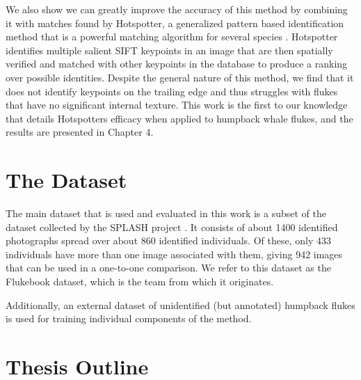 
We also show we can greatly improve the accuracy of this method by combining it with matches found by Hotspotter, a generalized pattern based identification method that is a powerful matching algorithm for several species \cite{crall_hotspotter_2013}.
Hotspotter identifies multiple salient SIFT keypoints in an image that are then spatially verified and matched with other keypoints in the database to produce a ranking over possible identities. %
Despite the general nature of this method, we find that it does not identify keypoints on the trailing edge and thus struggles with flukes that have no significant internal texture. 
This work is the first to our knowledge that details Hotspotters efficacy when applied to humpback whale flukes, and the results are presented in Chapter 4.

\section{The Dataset}

The main dataset that is used and evaluated in this work is a subset of the dataset collected by the SPLASH project \cite{calambokidis2008splash}. 
It consists of about 1400 identified photographs spread over about 860 identified individuals.
Of these, only 433 individuals have more than one image associated with them, giving 942 images that can be used in a one-to-one comparison.
We refer to this dataset as the Flukebook dataset, which is the team from which it originates. %

Additionally, an external dataset of unidentified (but annotated) humpback flukes is used for training individual components of the method.

\section{Thesis Outline}


